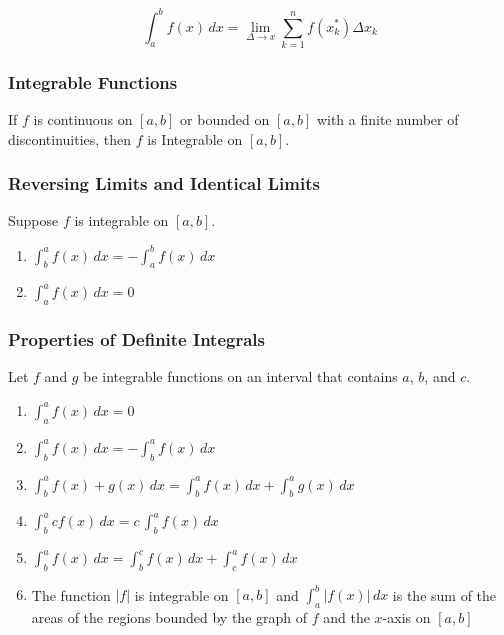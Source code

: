 \begin{equation}
    \int _a ^b f(x)\, dx = \lim _{\Delta \rightarrow x} \sum _{k = 1} ^n f(x_k ^*) \Delta x_k
\end{equation}

\subsubsection{Integrable Functions}
If $f$ is continuous on $[a, b]$ or bounded on $[a, b]$ with a finite number of discontinuities, then $f$ is Integrable on $[a, b]$. 

\subsubsection{Reversing Limits and Identical Limits}
Suppose $f$ is integrable on $[a, b]$.

\begin{enumerate}
    \item $\int _b ^a f(x)\, dx = -\int _a ^b f(x)\, dx$
    \item $\int _a ^a f(x)\, dx = 0$
\end{enumerate}

\subsubsection{Properties of Definite Integrals}
Let $f$ and $g$ be integrable functions on an interval that contains $a$, $b$, and $c$.

\begin{enumerate}
    \item $\int _a ^a f(x)\, dx = 0$
    \item $\int _b ^a f(x)\, dx = -\int _b ^a f(x)\, dx$
    \item $\int _b ^a f(x) + g(x)\, dx = \int _b ^a f(x)\, dx + \int _b ^a g(x)\, dx$
    \item $\int _b ^a cf(x)\, dx = c\,\int _b ^a f(x)\, dx$
    \item $\int _b ^a f(x)\, dx = \int _b ^c f(x)\, dx + \int _c ^a f(x)\, dx$
    \item The function $|f|$ is integrable on $[a, b]$ and $\int _a ^b |f(x)|\, dx$ is the sum of the areas of the regions bounded by the graph of $f$ and the $x$-axis on $[a, b]$
\end{enumerate}

